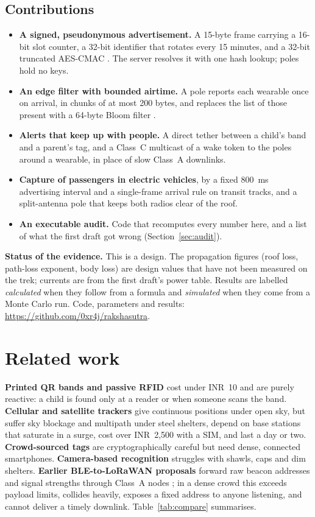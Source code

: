 \documentclass[11pt,a4paper]{article}
\begin{document}
\subsection*{Contributions}
\begin{itemize}
\item \textbf{A signed, pseudonymous advertisement.} A 15-byte frame carrying a 16-bit slot counter, a 32-bit identifier
that rotates every 15 minutes, and a 32-bit truncated AES-CMAC \cite{rfc4493}. The server resolves it with one hash
lookup; poles hold no keys.
\item \textbf{An edge filter with bounded airtime.} A pole reports each wearable once on arrival, in chunks of at most
200 bytes, and replaces the list of those present with a 64-byte Bloom filter \cite{bloom,kirsch}.
\item \textbf{Alerts that keep up with people.} A direct tether between a child's band and a parent's tag, and a
Class~C multicast of a wake token to the poles around a wearable, in place of slow Class~A downlinks.
\item \textbf{Capture of passengers in electric vehicles}, by a fixed 800~ms advertising interval and a single-frame
arrival rule on transit tracks, and a split-antenna pole that keeps both radios clear of the roof.
\item \textbf{An executable audit.} Code that recomputes every number here, and a list of what the first draft got wrong
(Section~\ref{sec:audit}).
\end{itemize}

\begin{finding}
\textbf{Status of the evidence.} This is a design. The propagation figures (roof loss, path-loss exponent, body loss) are
design values that have not been measured on the trek; currents are from the first draft's power table. Results are
labelled \emph{calculated} when they follow from a formula and \emph{simulated} when they come from a Monte Carlo run.
Code, parameters and results: \url{https://github.com/0xr4j/rakshasutra}.
\end{finding}

\section{Related work}
\textbf{Printed QR bands and passive RFID} cost under INR~10 and are purely reactive: a child is found only at a reader
or when someone scans the band. \textbf{Cellular and satellite trackers} give continuous positions under open sky, but
suffer sky blockage and multipath under steel shelters, depend on base stations that saturate in a surge, cost over
INR~2,500 with a SIM, and last a day or two. \textbf{Crowd-sourced tags} are cryptographically careful
\cite{heinrich} but need dense, connected smartphones. \textbf{Camera-based recognition} struggles with shawls, caps
and dim shelters. \textbf{Earlier BLE-to-LoRaWAN proposals} forward raw beacon addresses and signal strengths through
Class~A nodes \cite{augustin,adelantado}; in a dense crowd this exceeds payload limits, collides heavily, exposes a fixed
address to anyone listening, and cannot deliver a timely downlink. Table~\ref{tab:compare} summarises.
\end{document}
